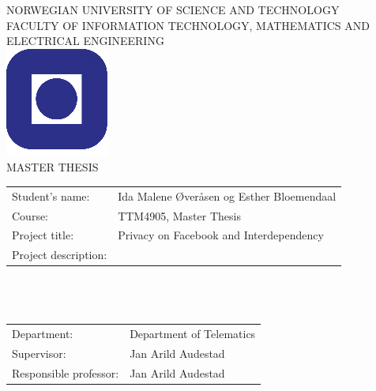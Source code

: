 \documentclass[a4paper,11pt]{article}
\begin{document}
\sffamily
\begin{titlepage}
\begin{center}
\textsc{NORWEGIAN UNIVERSITY OF SCIENCE AND TECHNOLOGY\\
FACULTY OF  INFORMATION TECHNOLOGY, MATHEMATICS AND ELECTRICAL ENGINEERING} \\
\vspace{0.5cm} 
\includegraphics[scale=0.5]{NTNU-logo} \\
\vspace{0.5cm}
{\Huge{MASTER THESIS}}
\vspace{0.5cm}
\end{center}

\begin{tabular}{@{}p{5cm}l}
Student's name:		& Ida Malene Øveråsen og Esther Bloemendaal\\
Course: 		& TTM4905, Master Thesis \\
Project title: 		& Privacy on Facebook and Interdependency \\
Project description: 	& \\
\end{tabular}
\\
\\
\paragraph{}
\paragraph{}


\vspace{0.2cm}
\begin{tabular}{@{}p{5cm}l}
Department:		& Department of Telematics \\
Supervisor:		& Jan Arild Audestad \\
Responsible professor: 	& Jan Arild Audestad \\
\end{tabular}

\end{titlepage}
\end{document}
